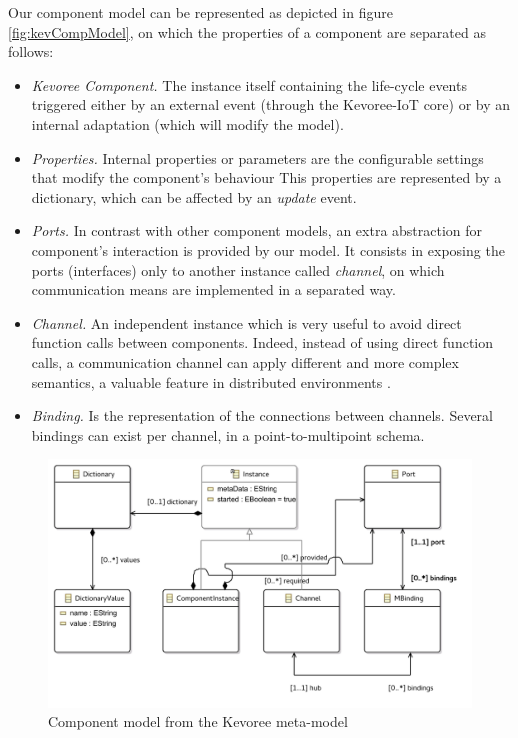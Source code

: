 Our component model can be represented as depicted in figure \ref{fig:kevCompModel}, on which the properties of a component are separated as follows:
\begin{itemize}
	\item \textit{Kevoree Component.} The instance itself containing the life-cycle events triggered either by an external event (through the Kevoree-IoT core) or by an internal adaptation (which will modify the model).
	\item \textit{Properties.} Internal properties or parameters are the configurable settings that modify the component's behaviour
	This properties are represented by a dictionary, which can be affected by an \textit{update} event.
	\item \textit{Ports.} In contrast with other component models, an extra abstraction for component's interaction is provided by our model.
	It consists in exposing the ports (interfaces) only to another instance called \textit{channel}, on which communication means are implemented in a separated way.
	\item \textit{Channel.} An independent instance which is very useful to avoid direct function calls between components.
	Indeed, instead of using direct function calls, a communication channel can apply different and more complex semantics, a valuable feature in distributed environments \cite{fouquet2013kevoree, barais2005construire}.
	\item \textit{Binding.} Is the representation of the connections between channels. Several bindings can exist per channel, in a point-to-multipoint schema.
\end{itemize}

\begin{figure}[htb]
	\centering
	\includegraphics[width=0.95\columnwidth]{chapters/inter-node.images/ComponentModelUML.pdf}
	\caption{Component model from the Kevoree meta-model} \label{fig:kevCompModelUML}
\end{figure}

